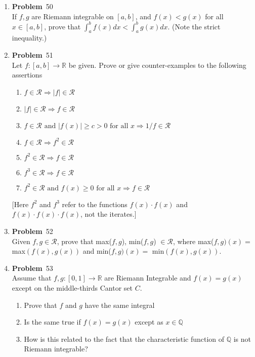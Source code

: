 \documentclass[12pt]{amsart}
\newcommand{\benu}{\begin{enumerate}}
\newcommand{\eenu}{\end{enumerate}}
\theoremstyle{definition}
\newcommand{\mbR}{\mathbb{R}}
\newcommand{\mbQ}{\mathbb{Q}}
\newcommand{\mcR}{\mathcal{R}}
\newcommand{\itep}{\item {\bfseries Problem}\ }
\begin{document}
\begin{enumerate}[series=p]
\newpage
\itep 50\\
If $f,g$ are Riemann integrable on $[a,b]$, and $f(x) < g(x)$ for all $x \in [a,b]$, prove that $\int_{a}^{b} f(x) dx < \int_{a}^{b} g(x) dx$.  (Note the strict inequality.)


\newpage
\itep 51\\
Let $f:[a,b] \to \mbR$ be given.  Prove or give counter-examples to the following assertions
	\benu
		\item $f \in \mcR \Rightarrow |f| \in \mcR$
		\item $|f| \in \mcR \Rightarrow f \in \mcR$
		\item $f \in \mcR \text{ and } |f(x)| \geq c >0 \text{ for all } x \Rightarrow 1/f \in \mcR$
		\item $f \in \mcR \Rightarrow f^2 \in \mcR$
		\item $f^2 \in \mcR \Rightarrow f \in \mcR$
		\item $f^3 \in \mcR \Rightarrow f \in \mcR$
		\item $f^2 \in \mcR \text{ and } f(x) \geq 0 \text{ for all } x \Rightarrow f \in \mcR$
	\eenu
[Here $f^2$ and $f^3$ refer to the functions $f(x) \cdot f(x)$ and $f(x) \cdot f(x) \cdot f(x)$, not the iterates.]


\newpage
\itep 52\\
Given $f, g \in \mcR$, prove that max($f,g$), min($f,g$) $\in \mcR$, where max($f,g)(x) = $ max$(f(x), g(x))$ and min($f,g)(x) = $ min$(f(x), g(x)).$



\newpage
\itep 53\\
Assume that $f,g:[0,1] \to \mbR$ are Riemann Integrable and $f(x) = g(x)$ except on the middle-thirds Cantor set $C$.
	\benu
		\item Prove that $f$ and $g$ have the same integral
		\item Is the same true if $f(x) = g(x)$ except as $x \in \mbQ$
		\item How is this related to the fact that the characteristic function of $\mbQ$ is not Riemann integrable?
	\eenu

\end{enumerate}
\end{document}

